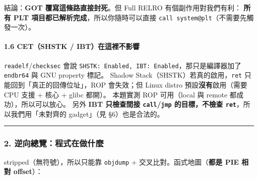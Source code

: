 \documentclass[10pt,a4paper]{article}
\renewenvironment{quote}{%
  \begin{mdframed}[linewidth=0pt,innerleftmargin=0pt,innerrightmargin=0pt,
    innerbottommargin=0pt,innertopmargin=0pt,skipabove=0.55em,skipbelow=0.55em,
    leftmargin=0.9em,rightmargin=0.4em,startcode={\color{quotebar}\vrule width 2.6pt},%
    endcode={}]%
  \itshape\color{black}%
}{%
  \end{mdframed}%
}
\begin{document}
\begin{quote}
結論：\textbf{GOT 覆寫這條路直接封死}。但 Full RELRO
有個副作用對我們有利： \textbf{所有 PLT
項目都已解析完成}，所以你隨時可以直接
\texttt{call\ \allowbreak{}system@plt}（不需要先觸發一次）。
\end{quote}

\paragraph{1.6 CET（SHSTK /
IBT）在這裡不影響}\label{cetshstk-ibtux5728ux9019ux88e1ux4e0dux5f71ux97ff}

\texttt{readelf}/\texttt{checksec} 會說
\texttt{SHSTK:\allowbreak{}\ \allowbreak{}Enabled,\allowbreak{}\ \allowbreak{}IBT:\allowbreak{}\ \allowbreak{}Enabled}，那只是編譯器加了
\texttt{endbr64} 與 GNU property 標記。 Shadow
Stack（SHSTK）若真的啟用，\texttt{ret} 只能回到「真正的回傳位址」，ROP
會失效；但 Linux distro 預設\textbf{沒有}啟用（需要 CPU 支援 + 核心 +
glibc 都開）。 本題實測 ROP 可用（local 與 remote
都成功），所以可以放心。 另外 \textbf{IBT 只檢查間接
\texttt{call}/\texttt{jmp} 的目標，不檢查
\texttt{ret}}，所以我們用「未對齊的 gadget」（見 §6）也是合法的。

\begin{center}\rule{0.5\linewidth}{0.5pt}\end{center}

\subsubsection{2.
逆向總覽：程式在做什麼}\label{ux9006ux5411ux7e3dux89bdux7a0bux5f0fux5728ux505aux4ec0ux9ebc}

stripped（無符號），所以只能靠 \texttt{objdump} +
交叉比對。函式地圖（\textbf{都是 PIE 相對 offset}）：
\end{document}

